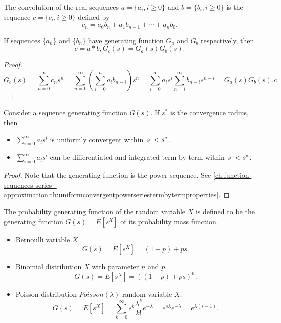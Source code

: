 \begin{refsection}
\begin{definition}
The convolution of the real sequences $a=\{a_i,i\geq 0\}$ and $b=\{b_i,i\geq 0\}$ is the sequence $c = \{c_i,i\geq 0\}$ defined by
$$c_n = a_0b_n + a_1b_{n-1} + \cdots +a_nb_0.$$
\end{definition}


\begin{lemma}\label{ch:theory-of-probability:th:convolutiontheoremofrealsequence}\cite[150]{grimmett2001probability}
If sequences $\{a_n\}$ and $\{b_n\}$ have generating function $G_a$ and $G_b$ respectively, then
$$c = a * b, G_c(s) = G_a(s)G_b(s).$$
\end{lemma}
\begin{proof}
	$$G_c(s) = \sum_{n=0}^{\infty} c_ns^n = \sum_{n=0}^\infty (\sum_{i=0}^n a_ib_{n-i})s^n = \sum_{i=0}^\infty a_is^i \sum_{n=i}^\infty b_{n-i}s^{n-i} = G_a(s)G_b(s).c$$
\end{proof}


\begin{lemma}\label{ch:theory-of-probability:th:termbytermoperationproperty}
Consider a sequence generating function $G(s)$. If $s^*$ is the convergence radius, then
\begin{itemize}
	\item $\sum_{i=0}^\infty a_is^i$ is uniformly convergent within $\abs{s}<s^*$.
	\item $\sum_{i=0}^\infty a_is^i$ can be differentiated and integrated term-by-term within $\abs{s}<s^*$.
\end{itemize} 
\end{lemma}
\begin{proof}
Note that the generating function is the power sequence. See \autoref{ch:function-sequences-series--approximation:th:uniformconvergentpowerseriestermbytermproperties}.
\end{proof}


\begin{definition}\cite[150]{grimmett2001probability}\label{ch:theory-of-probability:def:probabilitygeneratingfunction}
The probability generating function of the random variable $X$ is defined to be the generating function $G(s) = E[s^X]$ of its probability mass function.
\end{definition}

\begin{example}\hfill
\begin{itemize}
	\item Bernoulli variable $X$. $$G(s) = E[s^X] = (1-p) + ps.$$
	\item Binomial distribution $X$ with parameter $n$ and $p$. $$G(s) = E[s^X] = ((1-p) + ps)^n.$$	
	\item Poisson distribution $Poisson(\lambda)$ random variable $X$:
	$$G(s) = E[s^X] = \sum_{k=0}^\infty s^k \frac{\lambda^k}{k!}e^{-\lambda} = e^{s\lambda}e^{-\lambda} = e^{\lambda(s-1)}.$$ 
\end{itemize}
\end{example}



\end{refsection}
